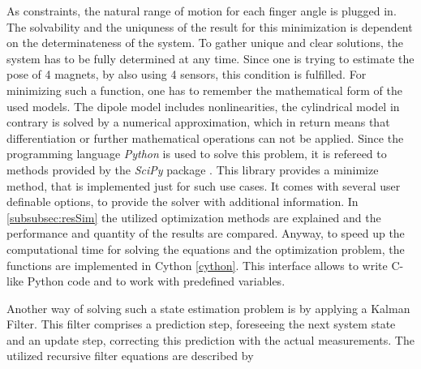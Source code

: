 As constraints, the natural range of motion for each finger angle is plugged in. The solvability and the uniquness of the result for this minimization is dependent on the determinateness of the system. To gather unique and clear solutions, the system has to be fully determined at any time. Since one is trying to estimate the pose of 4 magnets, by also using 4 sensors, this condition is fulfilled. For minimizing such a function, one has to remember the mathematical form of the used models. The dipole model includes nonlinearities, the cylindrical model in contrary is solved by a numerical approximation, which in return means that differentiation or further mathematical operations can not be applied. Since the programming language \emph{Python} \cite{python} is used to solve this problem, it is refereed to methods provided by the \emph{SciPy} \cite{scipy} package . This library provides a minimize method, that is implemented just for such use cases. It comes with several user definable options, to provide the solver with additional information. In \ref{subsubsec:resSim} the utilized optimization methods are explained and the performance and quantity of the results are compared. Anyway, to speed up the computational time for solving the equations and the optimization problem, the functions are implemented in Cython \ref{cython}. This interface allows to write C-like Python code and to work with predefined variables. 

Another way of solving such a state estimation problem is by applying a Kalman Filter. This filter comprises a prediction step, foreseeing the next system state and an update step, correcting this prediction with the actual measurements. The utilized recursive filter equations are described by

